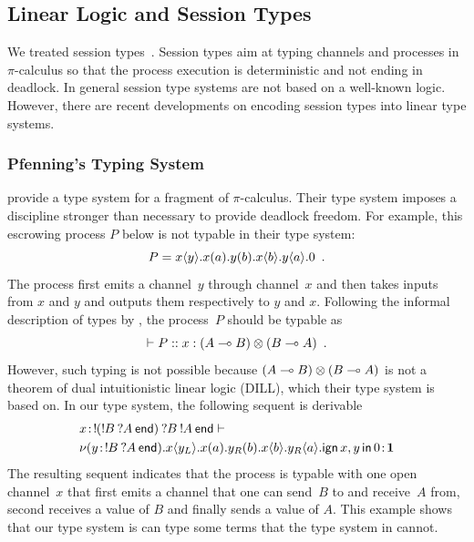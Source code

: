 \subsection{Linear Logic and Session Types}

We treated session types~\citep{honda-session}.
Session types aim at typing channels and processes in $\pi$-calculus so
that the process execution is deterministic and not ending in deadlock.
In general session type systems are not based on a well-known logic.
However, there are recent developments on encoding session types into
linear type systems.

\subsubsection{Pfenning's Typing System}
\label{pfenning}

\citet{pfenning2010} provide a type system for a fragment of $\pi$-calculus.
Their type system imposes a discipline stronger
than necessary to provide deadlock freedom.
For example, this escrowing process $P$ below is not typable in their type
system:
\[
 P = {x}\langle{y}\rangle.{{{x}({a}).{{{y}({b}).{{x}\langle{b}\rangle.{{y}\langle{a}\rangle.{0}}}}}}}\enspace.
\]
The process first emits a channel~$y$ through channel~$x$ and then
takes inputs from $x$ and $y$ and outputs them respectively to $y$ and $x$.
Following the informal description of types by \citet{pfenning2010},
the process~$P$ should be typable as
\[
 \vdash P::x:(A\multimap B)\otimes(B\multimap A)\enspace.
\]
However, such typing is not possible because $(A\multimap B)\otimes (B\multimap
A)$ is not a theorem of dual intuitionistic linear logic (DILL), which
their type system
is based on.
In our type system, the following sequent is derivable
\begin{align*}
&
{x} \mathord{\colon\kern -2pt}{\mathop{!}\kern -2pt{(\mathop{!}\kern -2pt{B}\hskip 2pt{\mathop{?}\kern -2pt{A}\hskip 2pt{\mathsf{end}}})}\hskip 2pt{\mathop{?}\kern -2pt{B}\hskip 2pt{\mathop{!}\kern -2pt{A}\hskip 2pt{\mathsf{end}}}}}
\vdash\\
&{
\nu({y} \mathord{\colon\kern -2pt}{\mathop{!}\kern -2pt{B}\hskip 2pt{\mathop{?}\kern -2pt{A}\hskip 2pt{\mathsf{end}}}}).
{{x}\langle{y_L}\rangle.{{{x}({a}).{{{y_R}({b}).{{x}\langle{b}\rangle.{{y_R}\langle{a}\rangle.{\mathsf{ign }\,{x,y}\,\mathsf{ in }\,{0}}}}}}}}}
} \mathord{\colon\kern -2pt}{\mathbf{1}}
\end{align*}
The resulting sequent indicates that the process is typable with one
open channel~$x$ that first emits
a channel that one can send~$B$ to and receive~$A$ from, second receives a
value of $B$ and
finally sends a value of $A$.
This example shows that our type system is can type some terms that
the type system in \citet{pfenning2010} cannot.

